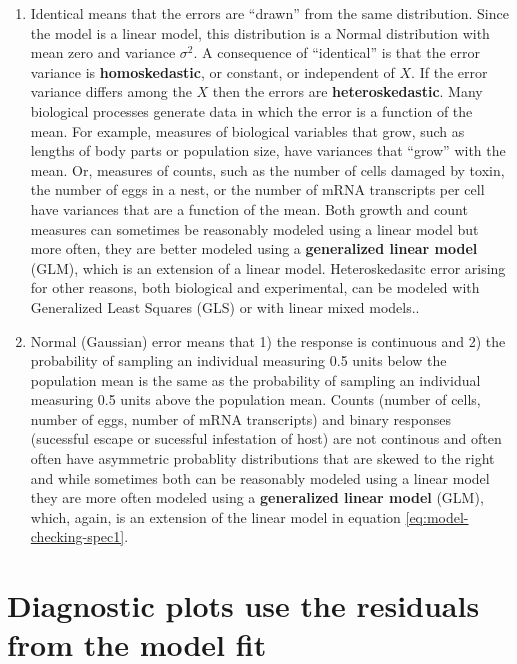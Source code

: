 \documentclass[]{book}
\begin{document}
\begin{enumerate}
\def\labelenumi{\arabic{enumi}.}
\setcounter{enumi}{1}
\item
  Identical means that the errors are ``drawn'' from the same
  distribution. Since the model is a linear model, this distribution is
  a Normal distribution with mean zero and variance \(\sigma^2\). A
  consequence of ``identical'' is that the error variance is
  \textbf{homoskedastic}, or constant, or independent of \(X\). If the
  error variance differs among the \(X\) then the errors are
  \textbf{heteroskedastic}. Many biological processes generate data in
  which the error is a function of the mean. For example, measures of
  biological variables that grow, such as lengths of body parts or
  population size, have variances that ``grow'' with the mean. Or,
  measures of counts, such as the number of cells damaged by toxin, the
  number of eggs in a nest, or the number of mRNA transcripts per cell
  have variances that are a function of the mean. Both growth and count
  measures can sometimes be reasonably modeled using a linear model but
  more often, they are better modeled using a \textbf{generalized linear
  model} (GLM), which is an extension of a linear model. Heteroskedasitc
  error arising for other reasons, both biological and experimental, can
  be modeled with Generalized Least Squares (GLS) or with linear mixed
  models..
\item
  Normal (Gaussian) error means that 1) the response is continuous and
  2) the probability of sampling an individual measuring 0.5 units below
  the population mean is the same as the probability of sampling an
  individual measuring 0.5 units above the population mean. Counts
  (number of cells, number of eggs, number of mRNA transcripts) and
  binary responses (sucessful escape or sucessful infestation of host)
  are not continous and often often have asymmetric probablity
  distributions that are skewed to the right and while sometimes both
  can be reasonably modeled using a linear model they are more often
  modeled using a \textbf{generalized linear model} (GLM), which, again,
  is an extension of the linear model in equation
  \eqref{eq:model-checking-spec1}.
\end{enumerate}

\section{Diagnostic plots use the residuals from the model
fit}\label{diagnostic-plots-use-the-residuals-from-the-model-fit}
\end{document}
